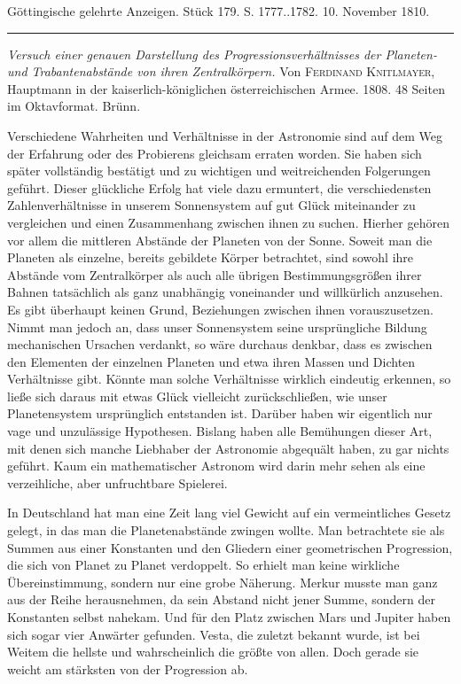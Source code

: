\hypertarget{native-533-lower}{}\label{native-533-lower}
\begin{center}\small Göttingische gelehrte Anzeigen. Stück 179. S. 1777..1782. 10. November 1810.\\[3pt]\rule{.72\linewidth}{.3pt}\end{center}

\emph{Versuch einer genauen Darstellung des Progressionsverhältnisses der Planeten- und Trabantenabstände von ihren Zentralkörpern.} Von \textsc{Ferdinand Knitlmayer}, Hauptmann in der kaiserlich-königlichen österreichischen Armee. 1808. 48 Seiten im Oktavformat. Brünn.

Verschiedene Wahrheiten und Verhältnisse in der Astronomie sind auf dem Weg der Erfahrung oder des Probierens gleichsam erraten worden. Sie haben sich später vollständig bestätigt und zu wichtigen und weitreichenden Folgerungen geführt. Dieser glückliche Erfolg hat viele dazu ermuntert, die verschiedensten Zahlenverhältnisse in unserem Sonnensystem auf gut Glück miteinander zu vergleichen und einen Zusammenhang zwischen ihnen zu suchen. Hierher gehören vor allem die mittleren Abstände der Planeten von der Sonne. Soweit man die Planeten als einzelne, bereits gebildete Körper betrachtet, sind sowohl ihre Abstände vom Zentralkörper als auch alle übrigen Bestimmungsgrößen ihrer Bahnen tatsächlich als ganz unabhängig voneinander und willkürlich anzusehen. Es gibt überhaupt keinen Grund, Beziehungen zwischen ihnen vorauszusetzen. Nimmt man jedoch an, dass unser Sonnensystem seine ursprüngliche Bildung mechanischen Ursachen verdankt, so wäre durchaus denkbar, dass es zwischen den Elementen der einzelnen Planeten und etwa ihren Massen und Dichten Verhältnisse gibt. Könnte man solche Verhältnisse wirklich eindeutig erkennen, so ließe sich daraus mit etwas Glück vielleicht zurückschließen, wie unser Planetensystem ursprünglich entstanden ist. Darüber haben wir eigentlich nur vage und unzulässige Hypothesen. Bislang haben alle Bemühungen dieser Art, mit denen sich manche Liebhaber der Astronomie abgequält haben, zu gar nichts geführt. Kaum ein mathematischer Astronom wird darin mehr sehen als eine verzeihliche, aber unfruchtbare Spielerei.

In Deutschland hat man eine Zeit lang viel Gewicht auf ein vermeintliches Gesetz gelegt, in das man die Planetenabstände zwingen wollte. Man betrachtete sie als Summen aus einer Konstanten und den Gliedern einer geometrischen Progression, die sich von Planet zu Planet verdoppelt. So erhielt man keine wirkliche Übereinstimmung, sondern nur eine grobe Näherung. Merkur musste man ganz aus der Reihe herausnehmen, da sein Abstand nicht jener Summe, sondern der Konstanten selbst nahekam. Und für den Platz zwischen Mars und Jupiter haben sich sogar vier Anwärter gefunden. Vesta, die zuletzt bekannt wurde, ist bei Weitem die hellste und wahrscheinlich die größte von allen. Doch gerade sie weicht am stärksten von der Progression ab.

